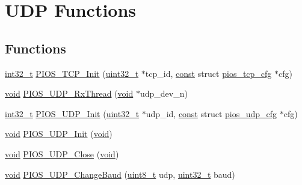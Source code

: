 \hypertarget{group___p_i_o_s___u_d_p}{\section{U\-D\-P Functions}
\label{group___p_i_o_s___u_d_p}
}
\subsection*{Functions}
\begin{DoxyCompactItemize}
\item 
\hyperlink{group___n_a_m_e_gafd12020da5a235dfcf0c3c748fb5baed}{int32\-\_\-t} \hyperlink{group___p_i_o_s___u_d_p_ga9db0408f2a64de1c08cfc59ed4e65989}{P\-I\-O\-S\-\_\-\-T\-C\-P\-\_\-\-Init} (\hyperlink{stdint_8h_a435d1572bf3f880d55459d9805097f62}{uint32\-\_\-t} $\ast$tcp\-\_\-id, \hyperlink{group___n_a_m_e_ga7ae6d0e43244213b34de2c2b9aa30da6}{const} struct \hyperlink{structpios__tcp__cfg}{pios\-\_\-tcp\-\_\-cfg} $\ast$cfg)
\item 
\hyperlink{group___n_a_m_e_ga18028b8badbf1ea7e704ccac3c488e82}{void} \hyperlink{group___p_i_o_s___u_d_p_ga43f06d5f6cb57fbc989eec4c0c4aae04}{P\-I\-O\-S\-\_\-\-U\-D\-P\-\_\-\-Rx\-Thread} (\hyperlink{group___n_a_m_e_ga18028b8badbf1ea7e704ccac3c488e82}{void} $\ast$udp\-\_\-dev\-\_\-n)
\item 
\hyperlink{group___n_a_m_e_gafd12020da5a235dfcf0c3c748fb5baed}{int32\-\_\-t} \hyperlink{group___p_i_o_s___u_d_p_ga049773bec7f678f274c44f7970167024}{P\-I\-O\-S\-\_\-\-U\-D\-P\-\_\-\-Init} (\hyperlink{stdint_8h_a435d1572bf3f880d55459d9805097f62}{uint32\-\_\-t} $\ast$udp\-\_\-id, \hyperlink{group___n_a_m_e_ga7ae6d0e43244213b34de2c2b9aa30da6}{const} struct \hyperlink{structpios__udp__cfg}{pios\-\_\-udp\-\_\-cfg} $\ast$cfg)
\item 
\hyperlink{group___n_a_m_e_ga18028b8badbf1ea7e704ccac3c488e82}{void} \hyperlink{group___p_i_o_s___u_d_p_gab790e95aa8ae4afdff0dbd5fbd566b33}{P\-I\-O\-S\-\_\-\-U\-D\-P\-\_\-\-Init} (\hyperlink{group___n_a_m_e_ga18028b8badbf1ea7e704ccac3c488e82}{void})
\item 
\hyperlink{group___n_a_m_e_ga18028b8badbf1ea7e704ccac3c488e82}{void} \hyperlink{group___p_i_o_s___u_d_p_ga2330953dc6b89dd787293fb3e9179675}{P\-I\-O\-S\-\_\-\-U\-D\-P\-\_\-\-Close} (\hyperlink{group___n_a_m_e_ga18028b8badbf1ea7e704ccac3c488e82}{void})
\item 
\hyperlink{group___n_a_m_e_ga18028b8badbf1ea7e704ccac3c488e82}{void} \hyperlink{group___p_i_o_s___u_d_p_gab239bb40339f719f5e74fc1a1d59f699}{P\-I\-O\-S\-\_\-\-U\-D\-P\-\_\-\-Change\-Baud} (\hyperlink{stdint_8h_aba7bc1797add20fe3efdf37ced1182c5}{uint8\-\_\-t} udp, \hyperlink{stdint_8h_a435d1572bf3f880d55459d9805097f62}{uint32\-\_\-t} baud)

\end{DoxyCompactItemize}
